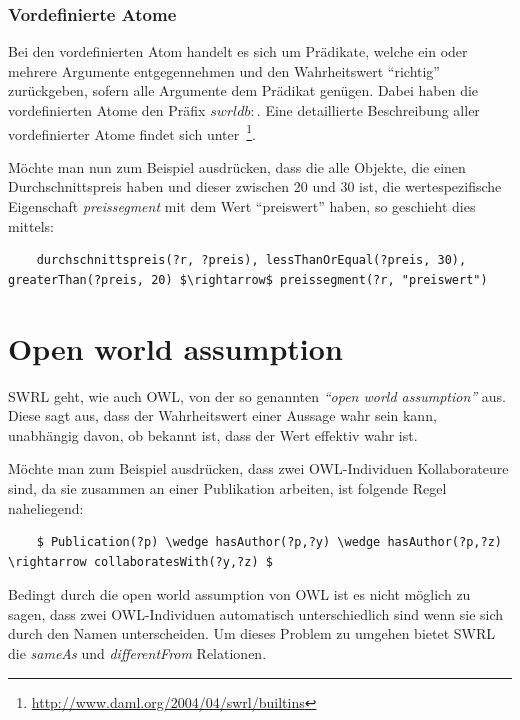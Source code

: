 \subsubsection{Vordefinierte Atome}
\label{ssubsec:swrl_aufbau_atomaretypen_vordefinierteatome}
Bei den vordefinierten Atom handelt es sich um Prädikate, welche ein oder mehrere Argumente entgegennehmen und den Wahrheitswert ``richtig'' zurückgeben, sofern alle Argumente dem Prädikat genügen. Dabei haben die vordefinierten Atome den Präfix $ swrldb: $. Eine detaillierte Beschreibung aller vordefinierter Atome findet sich unter~\footnote{\url{http://www.daml.org/2004/04/swrl/builtins}}.

Möchte man nun zum Beispiel ausdrücken, dass die alle Objekte, die einen Durchschnittspreis haben und dieser zwischen 20 und 30 ist, die wertespezifische Eigenschaft \textit{preissegment} mit dem Wert ``preiswert'' haben, so geschieht dies mittels:
\lstset{language=XML}
\begin{lstlisting}
    durchschnittspreis(?r, ?preis), lessThanOrEqual(?preis, 30), greaterThan(?preis, 20) $\rightarrow$ preissegment(?r, "preiswert")
\end{lstlisting}

\newpage

\section{Open world assumption}
\label{sec:swrl_openworldassumption}
SWRL geht, wie auch OWL, von der so genannten \textit{``open world assumption''} aus. Diese sagt aus, dass der Wahrheitswert einer Aussage wahr sein kann, unabhängig davon, ob bekannt ist, dass der Wert effektiv wahr ist.

Möchte man zum Beispiel ausdrücken, dass zwei OWL-Individuen Kollaborateure sind, da sie zusammen an einer Publikation arbeiten, ist folgende Regel naheliegend:

\lstset{language=XML}
\begin{lstlisting}
    $ Publication(?p) \wedge hasAuthor(?p,?y) \wedge hasAuthor(?p,?z) \rightarrow collaboratesWith(?y,?z) $
\end{lstlisting}

Bedingt durch die open world assumption von OWL ist es nicht möglich zu sagen, dass zwei OWL-Individuen automatisch unterschiedlich sind wenn sie sich durch den Namen unterscheiden. Um dieses Problem zu umgehen bietet SWRL die \textit{sameAs} und \textit{differentFrom} Relationen.

